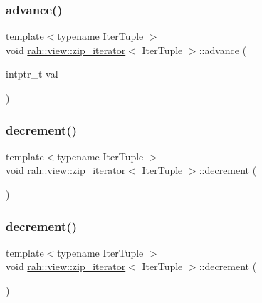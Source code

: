 \subsubsection{\texorpdfstring{advance()}{advance()}\hspace{0.1cm}{\footnotesize\ttfamily [2/2]}}
{\footnotesize\ttfamily template$<$typename Iter\+Tuple $>$ \\
void \mbox{\hyperlink{structrah_1_1view_1_1zip__iterator}{rah\+::view\+::zip\+\_\+iterator}}$<$ Iter\+Tuple $>$\+::advance (\begin{DoxyParamCaption}\item[{intptr\+\_\+t}]{val }\end{DoxyParamCaption})\hspace{0.3cm}{\ttfamily [inline]}}

\mbox{\label{structrah_1_1view_1_1zip__iterator_a5618c02a5596c1306d1abc0b1413f086}} 
\subsubsection{\texorpdfstring{decrement()}{decrement()}\hspace{0.1cm}{\footnotesize\ttfamily [1/2]}}
{\footnotesize\ttfamily template$<$typename Iter\+Tuple $>$ \\
void \mbox{\hyperlink{structrah_1_1view_1_1zip__iterator}{rah\+::view\+::zip\+\_\+iterator}}$<$ Iter\+Tuple $>$\+::decrement (\begin{DoxyParamCaption}{ }\end{DoxyParamCaption})\hspace{0.3cm}{\ttfamily [inline]}}

\mbox{\label{structrah_1_1view_1_1zip__iterator_a5618c02a5596c1306d1abc0b1413f086}} 
\subsubsection{\texorpdfstring{decrement()}{decrement()}\hspace{0.1cm}{\footnotesize\ttfamily [2/2]}}
{\footnotesize\ttfamily template$<$typename Iter\+Tuple $>$ \\
void \mbox{\hyperlink{structrah_1_1view_1_1zip__iterator}{rah\+::view\+::zip\+\_\+iterator}}$<$ Iter\+Tuple $>$\+::decrement (\begin{DoxyParamCaption}{ }\end{DoxyParamCaption})\hspace{0.3cm}{\ttfamily [inline]}}

